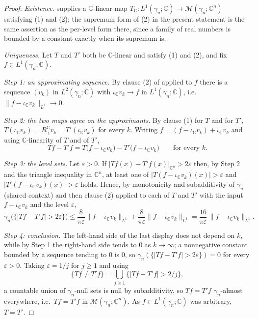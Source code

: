 \begin{proof}
\emph{Existence.}
 supplies a $\mathbb{C}$-linear map
$T_{\mathbb{C}} : L^1(\gamma_n;\mathbb{C}) \to \mathcal{M}(\gamma_n;\mathbb{C}^n)$
satisfying (1) and (2); the supremum form of (2) in the present statement is the
same assertion as the per-level form there, since a family of real numbers is
bounded by a constant exactly when its supremum is.

\emph{Uniqueness.}
Let $T$ and $T'$ both be $\mathbb{C}$-linear and satisfy (1) and (2), and fix
$f \in L^1(\gamma_n;\mathbb{C})$.

\emph{Step 1: an approximating sequence.}
By clause (2) of  applied to $f$ there is a
sequence $(v_k)$ in $L^2(\gamma_n;\mathbb{C})$ with
$\iota_{\mathbb{C}} v_k \to f$ in $L^1(\gamma_n;\mathbb{C})$, i.e.
$\|f - \iota_{\mathbb{C}} v_k\|_{L^1} \to 0$.

\emph{Step 2: the two maps agree on the approximants.}
By clause (1) for $T$ and for $T'$,
$T(\iota_{\mathbb{C}} v_k) = R_\gamma^{\mathbb{C}} v_k
 = T'(\iota_{\mathbb{C}} v_k)$ for every $k$.  Writing
$f = (f - \iota_{\mathbb{C}} v_k) + \iota_{\mathbb{C}} v_k$ and using
$\mathbb{C}$-linearity of $T$ and of $T'$,
\[
  Tf - T'f = T\bigl(f - \iota_{\mathbb{C}} v_k\bigr)
    - T'\bigl(f - \iota_{\mathbb{C}} v_k\bigr) \qquad\text{for every } k .
\]

\emph{Step 3: the level sets.}
Let $\varepsilon > 0$.  If $|Tf(x) - T'f(x)|_{\mathbb{C}^n} > 2\varepsilon$ then,
by Step 2 and the triangle inequality in $\mathbb{C}^n$, at least one of
$|T(f - \iota_{\mathbb{C}} v_k)(x)| > \varepsilon$ and
$|T'(f - \iota_{\mathbb{C}} v_k)(x)| > \varepsilon$ holds.  Hence, by
monotonicity and subadditivity of $\gamma_n$ (shared context) and then clause
(2) applied to each of $T$ and $T'$ with the input $f - \iota_{\mathbb{C}} v_k$
and the level $\varepsilon$,
\[
  \gamma_n\bigl(\{|Tf - T'f| > 2\varepsilon\}\bigr)
    \leq \frac{8}{\pi\varepsilon}\|f - \iota_{\mathbb{C}} v_k\|_{L^1}
       + \frac{8}{\pi\varepsilon}\|f - \iota_{\mathbb{C}} v_k\|_{L^1}
    = \frac{16}{\pi\varepsilon}\,\|f - \iota_{\mathbb{C}} v_k\|_{L^1} .
\]

\emph{Step 4: conclusion.}
The left-hand side of the last display does not depend on $k$, while by Step 1
the right-hand side tends to $0$ as $k \to \infty$; a nonnegative constant
bounded by a sequence tending to $0$ is $0$, so
$\gamma_n(\{|Tf - T'f| > 2\varepsilon\}) = 0$ for every $\varepsilon > 0$.
Taking $\varepsilon = 1/j$ for $j \geq 1$ and using
\[
  \{Tf \neq T'f\} = \bigcup_{j \geq 1}\{|Tf - T'f| > 2/j\} ,
\]
a countable union of $\gamma_n$-null sets is null by subadditivity, so
$Tf = T'f$ $\gamma_n$-almost everywhere, i.e.\ $Tf = T'f$ in
$\mathcal{M}(\gamma_n;\mathbb{C}^n)$.  As $f \in L^1(\gamma_n;\mathbb{C})$ was
arbitrary, $T = T'$.
\end{proof}

